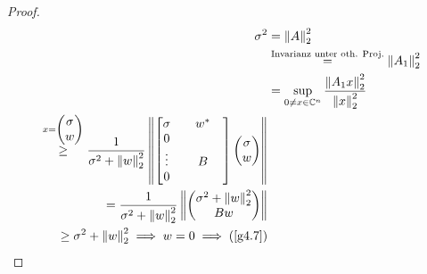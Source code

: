 \documentclass{book}
\def\C{\mathbb{C}}
\begin{document}
\begin{proof}
                \begin{align*}
                    \sigma^2&=\left\Vert A \right\Vert_2^2 \\
                    &\stackrel{\text{Invarianz unter oth. Proj.}}{=} \left\Vert A_1 \right\Vert_2^2\\
                    &=\sup_{0\neq x\in\C^n}\frac{\left\Vert A_1 x \right\Vert_2^2}{\left\Vert x \right\Vert_2^2}\\
                    \stackrel{x=\begin{pmatrix}\sigma\\w\end{pmatrix}}{\geq }\frac{1}{\sigma^2+\left\Vert w \right\Vert_2^2}\left\Vert\begin{bmatrix}
                        \sigma & & w^* & \\
                        0 & & &\\
                        \vdots & & B &\\
                        0 & & & 
                    \end{bmatrix}\begin{pmatrix}\sigma\\w\end{pmatrix}  \right\Vert\\
                    =\frac{1}{\sigma^2+\left\Vert w \right\Vert_2^2}\left\Vert \begin{pmatrix}\sigma^2 + \left\Vert w \right\Vert_2^2\\Bw\end{pmatrix} \right\Vert\\
                    \geq \sigma^2 + \left\Vert w \right\Vert_2^2 \implies w=0\implies (\ref{g4.7})
                \end{align*}
            \end{proof}
\end{document}
